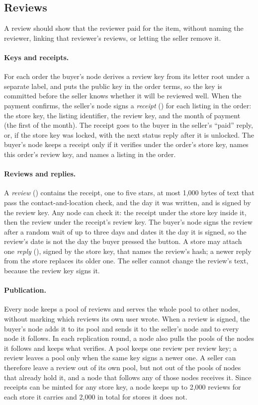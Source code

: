 \subsection{Reviews}
\label{sec:reviews}

A review should show that the reviewer paid for the item, without naming the reviewer, linking that reviewer's reviews, or letting the seller remove it.

\paragraph{Keys and receipts.} For each order the buyer's node derives a review key from its letter root under a separate label, and puts the public key in the order terms, so the key is committed before the seller knows whether it will be reviewed well. When the payment confirms, the seller's node signs a \emph{receipt} () for each listing in the order: the store key, the listing identifier, the review key, and the month of payment (the first of the month). The receipt goes to the buyer in the seller's ``paid'' reply, or, if the store key was locked, with the next status reply after it is unlocked. The buyer's node keeps a receipt only if it verifies under the order's store key, names this order's review key, and names a listing in the order.

\paragraph{Reviews and replies.} A \emph{review} () contains the receipt, one to five stars, at most 1{,}000 bytes of text that pass the contact-and-location check, and the day it was written, and is signed by the review key. Any node can check it: the receipt under the store key inside it, then the review under the receipt's review key. The buyer's node signs the review after a random wait of up to three days and dates it the day it is signed, so the review's date is not the day the buyer pressed the button. A store may attach one \emph{reply} (), signed by the store key, that names the review's hash; a newer reply from the store replaces its older one. The seller cannot change the review's text, because the review key signs it.

\paragraph{Publication.} Every node keeps a pool of reviews and serves the whole pool to other nodes, without marking which reviews its own user wrote. When a review is signed, the buyer's node adds it to its pool and sends it to the seller's node and to every node it follows. In each replication round, a node also pulls the pools of the nodes it follows and keeps what verifies. A pool keeps one review per review key; a review leaves a pool only when the same key signs a newer one. A seller can therefore leave a review out of its own pool, but not out of the pools of nodes that already hold it, and a node that follows any of those nodes receives it. Since receipts can be minted for any store key, a node keeps up to 2{,}000 reviews for each store it carries and 2{,}000 in total for stores it does not.

